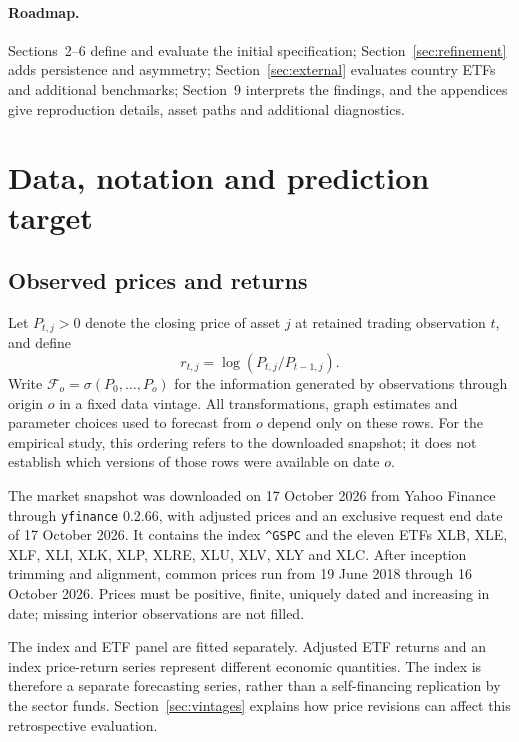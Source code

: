 \documentclass[12pt,a4paper]{article}
\newcommand{\F}{\mathcal F}
\begin{document}
\paragraph{Roadmap.}
Sections~2--6 define and evaluate the initial specification;
Section~\ref{sec:refinement} adds persistence and asymmetry;
Section~\ref{sec:external} evaluates country ETFs and additional benchmarks;
Section~9 interprets the findings, and the appendices give reproduction
details, asset paths and additional diagnostics.

\section{Data, notation and prediction target}
\subsection{Observed prices and returns}
Let $P_{t,j}>0$ denote the closing price of asset $j$ at retained trading
observation $t$, and define
\begin{equation}
r_{t,j}=\log(P_{t,j}/P_{t-1,j}).
\label{eq:returns}
\end{equation}
Write $\F_o=\sigma(P_0,\ldots,P_o)$ for the information generated by observations
through origin $o$ in a fixed data vintage. All transformations, graph estimates
and parameter choices used to forecast from $o$ depend only on these rows.
For the empirical study, this ordering refers to the downloaded snapshot;
it does not establish which versions of those rows were available on date $o$.

The market snapshot was downloaded on 17 October 2026 from Yahoo Finance through
\texttt{yfinance} 0.2.66, with adjusted prices and an exclusive request end date
of 17 October 2026. It contains the index \texttt{\^{}GSPC} and the eleven ETFs
XLB, XLE, XLF, XLI, XLK, XLP, XLRE, XLU, XLV, XLY and XLC. After inception trimming
and alignment, common prices run from 19 June 2018 through 16 October 2026.
Prices must be positive, finite, uniquely dated and increasing in date; missing
interior observations are not filled.

The index and ETF panel are fitted separately. Adjusted ETF returns and an index
price-return series represent different economic quantities. The index is
therefore a separate forecasting series, rather than a self-financing
replication by the sector funds. Section~\ref{sec:vintages} explains how
price revisions can affect this retrospective evaluation.
\end{document}
